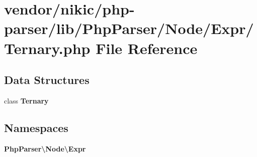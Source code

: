 \section{vendor/nikic/php-\/parser/lib/\+Php\+Parser/\+Node/\+Expr/\+Ternary.php File Reference}
\label{_ternary_8php}
\subsection*{Data Structures}
\begin{DoxyCompactItemize}
\item 
class {\bf Ternary}
\end{DoxyCompactItemize}
\subsection*{Namespaces}
\begin{DoxyCompactItemize}
\item 
 {\bf Php\+Parser\textbackslash{}\+Node\textbackslash{}\+Expr}
\end{DoxyCompactItemize}
